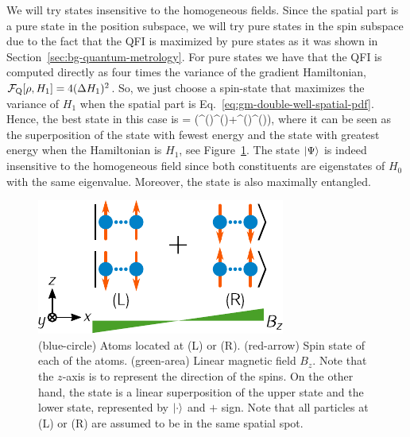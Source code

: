 We will try states insensitive to the homogeneous fields.
Since the spatial part is a pure state in the position subspace, we will try pure states in the spin subspace due to the fact that the QFI is maximized by pure states as it was shown in Section~\ref{sec:bg-quantum-metrology}.
For pure states we have that the QFI is computed directly as four times the variance of the gradient Hamiltonian, $\mathcal{F}_{\textnormal{Q}}[{\textstyle \rho, H_1}]=4(\Delta H_1 )^2$.
So, we just choose a spin-state that maximizes the variance of $H_1$ when the spatial part is Eq.~\eqref{eq:gm-double-well-spatial-pdf}.
Hence, the best state in this case is
\be
  \label{eq:best-state}
  \ket{\Psi} = (^{()}^{()}+^{()}^{()}),
\ee
where it can be seen as the superposition of the state with fewest energy and the state with greatest energy when the Hamiltonian is $H_1$, see Figure~\ref{fig:gm-double-well}.
The state $\vert{\Psi}\rangle$ is indeed insensitive to the homogeneous field since both constituents are eigenstates of $H_0$ with the same eigenvalue.
Moreover, the state is also maximally entangled.
\begin{figure}[htp]
  \begin{center}
    \includegraphics[scale=1.2]{img/GM_double_well.pdf}
    \caption[Best entangled state for the spatial two-ensembles]{(blue-circle) Atoms located at (L) or (R).
    (red-arrow) Spin state of each of the atoms.
    (green-area) Linear magnetic field $B_z$.
    Note that the $z$-axis is to represent the direction of the spins.
    On the other hand, the state is a linear superposition of the upper state and the lower state, represented by $\vert{\cdot}\rangle$ and $+$ sign.
    Note that all particles at (L) or (R) are assumed to be in the same spatial spot.}
    \label{fig:gm-double-well}
  \end{center}
\end{figure}

